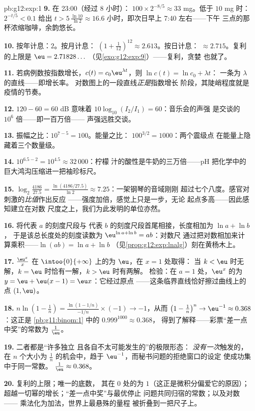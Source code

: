 \begin{solution}{pb:g12:exp:1}
\textbf{9.} 在 23:00（经过 $8$ 小时）：
$100 \times 2^{-8/5} \approx 33$ mg。低于 $10$ mg 时：
$2^{-t/5} < 0.1$ 给出 $t > 5\,\frac{\ln 10}{\ln 2} \approx
16.6$ 小时，即次日早上 7:40 左右——下午
三点的那杯浓缩咖啡，余韵悠长。

\textbf{10.} 按年计息：$2$。按月计息：
$\left(1 + \frac{1}{12}\right)^{12} \approx 2.613$。按日计息：
$\approx 2.715$。复利的上限是 $\eu = 2.71828\ldots$
（见\cref{exo:g12:exp:9}）——复利，贪婪
也就了。

\textbf{11.} 若病例数按指数增长，$c(t) = c_0
\eu^{\lambda t}$，则 $\ln c(t) = \ln c_0 + \lambda t$：
一条为 $\lambda$ 的直线——即增长率。
对数图上的一段直线\emph{正是}指数增长
阶段，其陡峭程度就是疫情的节奏。

\textbf{12.} $120 - 60 = 60$ dB 意味着
$10\log_{10}(I_2/I_1) = 60$：音乐会的声强
是交谈的 $10^6$ 倍——即一百万倍——
声强远胜交谈。

\textbf{13.} 振幅之比：$10^{7-5} = 100$。能量之比：
$100^{3/2} = 1000$：两个震级点
在能量上隐藏着三个数量级。

\textbf{14.} $10^{6.5 - 2} = 10^{4.5} \approx 32\,000$：柠檬
汁的酸性是牛奶的三万倍——pH
把化学中的巨大鸿沟压缩进一把袖珍标尺。

\textbf{15.} $\log_2\!\frac{4186}{27.5} =
\frac{\ln(4186/27.5)}{\ln 2} \approx 7.25$：一架钢琴的音域刚刚
超过七个八度。感官对刺激的\emph{比值}作出反应
——强度加倍，感觉上只是一步，无论
起点多高——因此感知建立在对数
尺度之上，我们为此发明的单位亦然。

\textbf{16.} 将代表 $a$ 的刻度尺段与
代表 $b$ 的刻度尺段首尾相接，长度相加为 $\ln a + \ln b$，
于是该总长度处的刻度读数为
$\eu^{\ln a + \ln b} = ab$：对数尺
通过把对数相加来计算乘积——$\ln(ab) = \ln a + \ln b$
（见\cref{prop:g12:exp:lnalg}）刻在黄杨木上。

\textbf{17.} $\frac{\eu^x}{x}$ 在
$\intoo{0}{+\infty}$ 上的为 $\eu$，在 $x = 1$ 处取得：
当 $k < \eu$ 时无解，$k = \eu$ 时恰有一解，$k > \eu$ 时有两解。
检验：在 $a = 1$ 处，$\eu^x$ 的为
$y = \eu + \eu(x - 1) = \eu x$：它经过原点
——这条临界直线恰好擦过曲线上的点 $(1, \eu)$。

\textbf{18.} $n \ln\!\left(1 - \frac1n\right) =
\frac{\ln(1 - 1/n)}{-1/n} \times (-1) \to -1$，从而
$\left(1 - \frac1n\right)^n \to \eu^{-1} \approx 0.368$：这正是
\cref{pb:g11:binom:1} 中的 $0.999^{1000} \approx 0.368$，
得到了解释——彩票“差一点中奖”的常数为
$\frac1\eu$。

\textbf{19.} 二者都是“许多独立
且各自不太可能发生的”的极限形态：
\emph{没有一次}触发的，在 $n$ 个大小为 $\frac1n$ 的机会中，趋于
$\eu^{-1}$，而秘书问题的拒绝窗口的设定
使成功集中于同一常数。
$\frac1\eu \approx 0.368$。

\textbf{20.} 复利的上限；唯一的底数，
其在 $0$ 处的为 $1$（这正是微积分偏爱它的原因）；
超越一切幂的增长；“差一点中奖”与最优停止
问题共同归宿的常数；以及对数——
乘法化为加法，世界上最悬殊的量程
被折叠到一把尺子上。
\end{solution}
